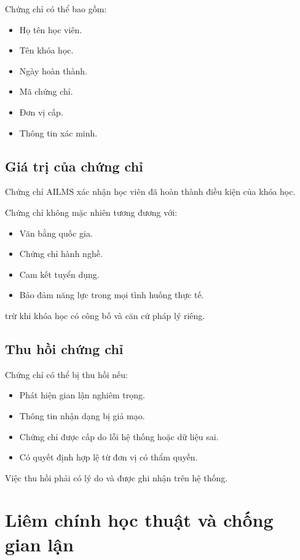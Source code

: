 \documentclass[12pt,a4paper]{article}
\begin{document}
Chứng chỉ có thể bao gồm:

\begin{itemize}
    \item Họ tên học viên.
    \item Tên khóa học.
    \item Ngày hoàn thành.
    \item Mã chứng chỉ.
    \item Đơn vị cấp.
    \item Thông tin xác minh.
\end{itemize}

\subsection{Giá trị của chứng chỉ}

Chứng chỉ AILMS xác nhận học viên đã hoàn thành điều kiện của khóa học.

Chứng chỉ không mặc nhiên tương đương với:

\begin{itemize}
    \item Văn bằng quốc gia.
    \item Chứng chỉ hành nghề.
    \item Cam kết tuyển dụng.
    \item Bảo đảm năng lực trong mọi tình huống thực tế.
\end{itemize}

trừ khi khóa học có công bố và căn cứ pháp lý riêng.

\subsection{Thu hồi chứng chỉ}

Chứng chỉ có thể bị thu hồi nếu:

\begin{itemize}
    \item Phát hiện gian lận nghiêm trọng.
    \item Thông tin nhận dạng bị giả mạo.
    \item Chứng chỉ được cấp do lỗi hệ thống hoặc dữ liệu sai.
    \item Có quyết định hợp lệ từ đơn vị có thẩm quyền.
\end{itemize}

Việc thu hồi phải có lý do và được ghi nhận trên hệ thống.

\section{Liêm chính học thuật và chống gian lận}
\end{document}
